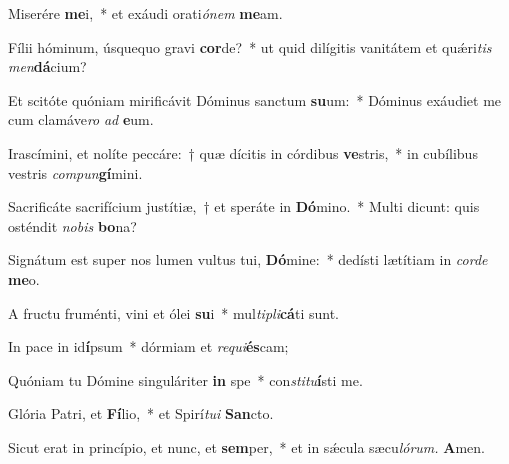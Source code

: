 \item Miserére \textbf{me}i,~* et exáudi orati\textit{ónem} \textbf{me}am.
\item Fílii hóminum, úsquequo gravi \textbf{cor}de?~* ut quid dilígitis vanitátem et quǽri\hspace{0.02em}\textit{tis} \textit{men}\textbf{dá}cium?
\item Et scitóte quóniam mirificávit Dóminus san\-ctum \textbf{su}um:~* Dóminus exáudiet me cum clamáve\teenyhspace\textit{ro} \textit{ad} \textbf{e}um.
\item Irascímini, et nolíte peccáre:~† quæ dícitis in córdibus \textbf{ve}stris,~* in cubílibus vestris \textit{compun}\textbf{gí}mini.
\item Sacrificáte sacrifícium justítiæ,~† et speráte in \textbf{Dó}mino.~* Multi dicunt: quis osténdit \textit{nobis} \textbf{bo}na?
\item Signátum est super nos lumen vultus tui, \textbf{Dó}mine:~* dedísti lætítiam in \textit{corde} \textbf{me}o.
\item A fru\-ctu fruménti, vini et ólei \textbf{su}i~* mul\textit{tipli}\textbf{cá}ti sunt.
\item In pace in id\textbf{í}psum~* dórmiam et \textit{requi}\textbf{és}cam;
\item Quóniam tu Dómine singuláriter \textbf{in} spe~* con\tinyhspace\textit{stitu}\textbf{í}sti me.
\item Glória Patri, et \textbf{Fí}lio,~* et Spirí\tinyhspace\textit{tui} \textbf{San}cto.
\item Sicut erat in princípio, et nunc, et \textbf{sem}per,~* et in sǽcula sæcu\tinyhspace\textit{lórum.} \textbf{A}men.